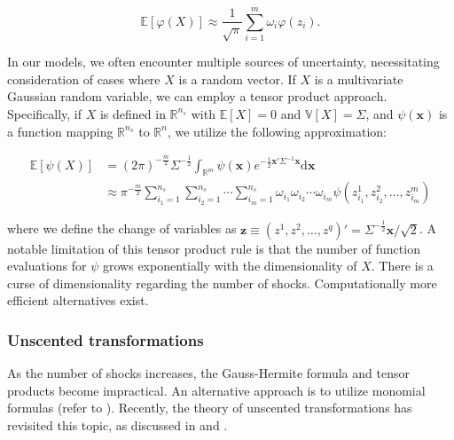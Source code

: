 \documentclass[a4paper,12pt]{amsart}
\begin{document}
\[
\mathbb{E}[\varphi(X)] \approx \frac{1}{\sqrt{\pi}} \sum_{i=1}^m \omega_i \varphi(z_i).
\]

In our models, we often encounter multiple sources of uncertainty,
necessitating consideration of cases where $X$ is a random
vector. If $X$ is a multivariate Gaussian random variable, we can
employ a tensor product approach. Specifically, if $X$ is defined
in $\mathbb{R}^{n_s}$ with $\mathbb{E}[X] = 0$
and $\mathbb{V}[X] = \Sigma$, and $\psi(\mathbf{x})$ is a function
mapping $\mathbb{R}^{n_s}$ to $\mathbb{R}^n$, we utilize the following
approximation:

\[
\begin{split}
\mathbb{E}[\psi(X)] &=(2\pi)^{-\frac{m}{2}} \Sigma^{-\frac{1}{2}} \int_{\mathbb{R}^m} \psi(\mathbf{x}) e^{-\frac{1}{2} \mathbf{x}' \Sigma^{-1} \mathbf{x}} \mathrm{d}\mathbf{x} \\
& \approx \pi^{-\frac{m}{2}} \sum_{i_1=1}^{n_s} \sum_{i_2=1}^{n_s} \cdots \sum_{i_m=1}^{n_s} \omega_{i_1} \omega_{i_2} \cdots \omega_{i_m} \psi(z_{i_1}^1, z_{i_2}^2, \ldots, z_{i_m}^m)
\end{split}
\]

where we define the change of variables
as
$\mathbf{z} \equiv (z^1, z^2, \ldots, z^q)' = \Sigma^{-\frac{1}{2}} \mathbf{x} / \sqrt{2}$. A
notable limitation of this tensor product rule is that the number of
function evaluations for $\psi$ grows exponentially with the
dimensionality of $X$. There is a curse of dimensionality regarding
the number of shocks. Computationally more efficient
alternatives exist.\newline


\subsubsection{Unscented transformations}

As the number of shocks increases, the Gauss-Hermite formula and
tensor products become impractical. An alternative approach is to
utilize monomial formulas (refer to \textcite{Stroud1971}). Recently,
the theory of unscented transformations has revisited this topic, as
discussed in \textcite{Julier2000} and \textcite{Julier2002}.\newline
\end{document}
